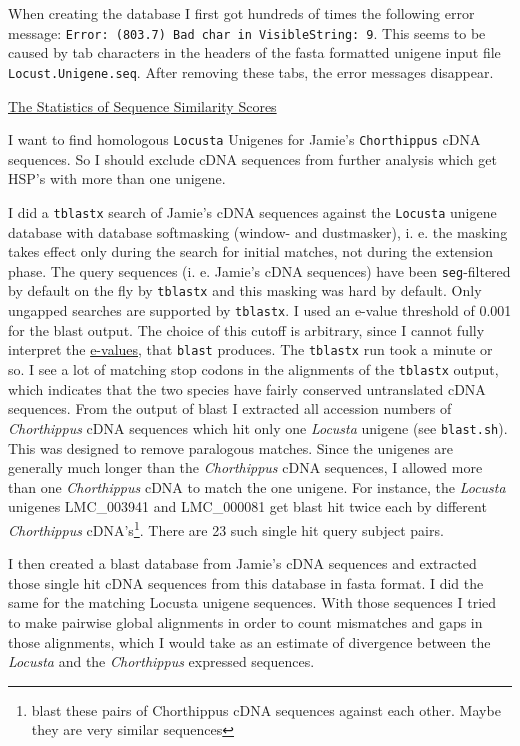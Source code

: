 \documentclass{article}\usepackage[]{graphicx}\usepackage[]{color}
\begin{document}
When creating the database I first got hundreds of times the following error message:
\texttt{Error: (803.7) Bad char in VisibleString: 9}. This seems to be caused by tab characters in the headers of the fasta formatted unigene input file \texttt{Locust.Unigene.seq}. After removing these tabs, the error messages disappear.


\href{http://www.ncbi.nlm.nih.gov/BLAST/tutorial/Altschul-1.html}{The Statistics of Sequence Similarity Scores}

I want to find homologous \texttt{Locusta} Unigenes for Jamie's \texttt{Chorthippus} cDNA sequences. So I should exclude cDNA sequences from further analysis which get  HSP's with more than one unigene.

I did a \texttt{tblastx} search of Jamie's cDNA sequences against the \texttt{Locusta} unigene database with database softmasking (window- and dustmasker), i. e. the masking takes effect only during the search for initial matches, not during the extension phase. The query sequences (i. e. Jamie's cDNA sequences) have been \texttt{seg}-filtered by default on the fly by \texttt{tblastx} and this masking was hard by default. Only ungapped searches are supported by \texttt{tblastx}. I used an e-value threshold of 0.001 for the blast output. The choice of this cutoff is arbitrary, since I cannot fully interpret the \href{http://www.ncbi.nlm.nih.gov/BLAST/tutorial/Altschul-1.html#head2}{e-values}, that \texttt{blast} produces. The \texttt{tblastx} run took a minute or so. I see a lot of matching stop codons in the alignments of the \texttt{tblastx} output, which indicates that the two species have fairly conserved untranslated cDNA sequences. From the output of blast I extracted all accession numbers of \textit{Chorthippus} cDNA sequences which hit only one \textit{Locusta} unigene (see \texttt{blast.sh}). This was designed to remove paralogous matches. Since the unigenes are generally much longer than the \textit{Chorthippus} cDNA sequences, I allowed more than one \textit{Chorthippus} cDNA to match the one unigene. For instance, the \textit{Locusta} unigenes LMC\_003941 and LMC\_000081 get blast hit twice each by different \textit{Chorthippus} cDNA's\footnote{blast these pairs of Chorthippus cDNA sequences against each other. Maybe they are very similar sequences}. There are 23 such single hit query subject pairs. 


I then created a blast database from Jamie's cDNA sequences and extracted those single hit cDNA sequences from this database in fasta format. I did the same for the matching Locusta unigene sequences. With those sequences I tried to make pairwise global alignments in order to count mismatches and gaps in those alignments, which I would take as an estimate of divergence between the \textit{Locusta} and the \textit{Chorthippus} expressed sequences. 
\end{document}
